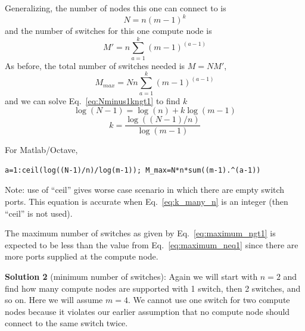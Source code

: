 \documentclass[pdftex]{article}
\begin{document}



Generalizing, the number of nodes this one can connect to is
\begin{equation}
 N=n(m-1)^k
 \label{eq:Nminus1kngt1}
\end{equation}
and the number of switches for this one compute node is
\begin{equation}
 M'=n\sum_{a=1}^{k} (m-1)^{(a-1)}
\end{equation}
As before, the total number of switches needed is $M=N M'$,
\begin{equation}
\boxed{
 M_{max}=N n\sum_{a=1}^{k} (m-1)^{(a-1)}
 }
 \label{eq:maximum_ngt1}
\end{equation}
and we can solve Eq.~\ref{eq:Nminus1kngt1} to find $k$
\begin{equation}
 \log(N-1)=\log(n) + k\log(m-1)
\end{equation}
\begin{equation}
 k=\frac{\log((N-1)/n)}{\log(m-1)}
 \label{eq:k_many_n}
\end{equation}

For Matlab/Octave,
\begin{verbatim}
a=1:ceil(log((N-1)/n)/log(m-1)); M_max=N*n*sum((m-1).^(a-1))
\end{verbatim}
Note: use of ``ceil'' gives worse case scenario in which there are empty switch ports. This equation is accurate when Eq.~\ref{eq:k_many_n} is an integer (then ``ceil'' is not used).

The maximum number of switches as given by Eq.~\ref{eq:maximum_ngt1} is expected to be less than the value from Eq.~\ref{eq:maximum_neq1} since there are more ports supplied at the compute node.

\textbf{Solution 2} (minimum number of switches): Again we will start with $n=2$ and find how many compute nodes are supported with 1 switch, then 2 switches, and so on. Here we will assume $m=4$. We cannot use one switch for two compute nodes because it violates our earlier assumption that no compute node should connect to the same switch twice.
\end{document}
